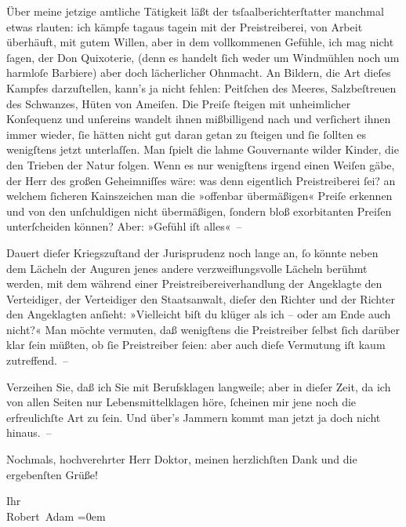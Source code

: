 \pstart
           Über meine jetzige amtliche Tätigkeit läßt der tsſaalberichterſtatter manchmal etwas rlauten: ich kämpfe tagaus tagein mit der Preistreiberei, von Arbeit
               überhäuft, mit gutem Willen, aber in dem vollkommenen Gefühle, ich mag nicht ſagen,
               der Don Quixoterie,  (denn es handelt ſich weder um Windmühlen noch um
               harmloſe Barbiere) aber doch lächerlicher Ohnmacht. An Bildern, die Art dieſes
               Kampfes darzuſtellen, kann’s ja nicht fehlen: Peitſchen des Meeres, Salzbeſtreuen des
               Schwanzes, Hüten von Ameiſen. Die Preiſe ſteigen mit unheimlicher Konſequenz und
               unſereins wandelt ihnen mißbilligend nach {\pb}und
               verſichert ihnen immer wieder, ſie hätten nicht gut daran getan zu ſteigen und ſie
               ſollten es wenigſtens jetzt unterlaſſen. Man ſpielt die lahme Gouvernante wilder
               Kinder, die den Trieben der Natur folgen. Wenn es nur wenigſtens irgend einen Weiſen
               gäbe, der Herr des großen Geheimniſſes wäre: was denn eigentlich Preistreiberei ſei?
               an welchem ſicheren Kainszeichen man die »offenbar übermäßigen« Preiſe erkennen und
               von den unſchuldigen nicht übermäßigen, ſondern bloß exorbitanten Preiſen
               unterſcheiden können? Aber: »Gefühl iſt alles« –\pend
           
\pstart
           Dauert dieſer Kriegszuſtand der Jurisprudenz noch lange an, ſo könnte neben dem
               Lächeln der Auguren jenes andere verzweiflungsvolle Lächeln berühmt werden, mit dem
               während einer Preistreibereiverhandlung der Angeklagte den Verteidiger, der
               Verteidiger den Staatsanwalt, dieſer den Richter und der Richter den Angeklagten
               anſieht: »Vielleicht biſt du {\pb}klüger als ich – oder am
               Ende auch nicht?« Man möchte vermuten, daß wenigſtens die Preistreiber \introOben{}\introOben{}{ }ſelbst \introOben{}ſich\introOben{} darüber klar
               ſein müßten, ob ſie Preistreiber ſeien: aber auch dieſe Vermutung iſt  kaum zutreffend. –\pend
           
\pstart
           Verzeihen Sie, daß ich Sie mit Berufsklagen langweile; aber in dieſer Zeit, da ich
               von allen Seiten nur Lebensmittelklagen höre, ſcheinen mir jene noch die
               erfreulichſte Art zu ſein. Und über’s Jammern kommt man jetzt ja doch nicht
               hinaus. –\pend
           
\pstart
           Nochmals, hochverehrter Herr Doktor, meinen herzlichſten Dank und die ergebenſten
               Grüße!\pend
           
\pstart
           Ihr{\\[\baselineskip]}\spacefill\mbox{Robert Adam}\pend
           \leftskip=0em{}\endnumbering{}  
      